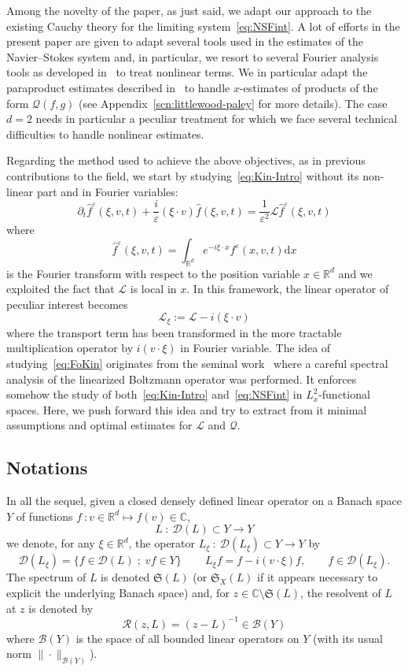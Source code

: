 \documentclass[AHL,Unicode,longabstracts,published]{cedram}
\renewcommand{\d}{\mathrm{d}}
\newcommand{\R}{\mathbb{R}}
\newcommand{\C}{\mathbb{C}}
\newcommand{\fkS}{\mathfrak{S}}
\newcommand{\LL}{\mathcal{L}}
\newcommand{\QQ}{\mathcal{Q}}
\newcommand{\RR}{\mathcal{R}}
\newcommand{\dom}{\mathscr{D}}
\newcommand{\BBB}{\mathscr{B}}
\newcommand*\eps{{\varepsilon}}
\begin{document}
Among the novelty of the paper, as just said, we adapt our approach to the existing Cauchy theory for the limiting system~\eqref{eq:NSFint}. A lot of efforts in the present paper are given to adapt several tools used in the estimates of the Navier--Stokes system and, in particular, we resort to several Fourier analysis tools as developed in~\cite{BCD2011} to treat nonlinear terms. We in particular adapt the paraproduct estimates described in~\cite{BCD2011} to handle $x$-estimates of products of the form $\QQ(f,g)$ (see Appendix~\ref{scn:littlewood-paley} for more details). The case $d=2$ needs in particular a peculiar treatment for which we face several technical difficulties to handle nonlinear estimates.



Regarding the method used to achieve the above objectives, as in previous contributions to the field, we start by studying~\eqref{eq:Kin-Intro} without its non-linear part and in Fourier variables:
\begin{equation}\label{eq:FoKin}
\partial_{t}\widehat{f}^{\eps}(\xi,v,t)+\frac{i}{\eps}(\xi \cdot v)\widehat{f}(\xi,v,t)=\frac{1}{\eps^{2}}\LL \widehat{f}^{\eps}(\xi,v,t)
\end{equation}
where
\[
\widehat{f}^{\eps}(\xi,v,t)=\int_{\R^{d}}e^{-i \xi \cdot x}f^{\eps}(x,v,t)\d x
\]
is the Fourier transform with respect to the position variable $x\in \R^{d}$ and we exploited the fact that $\LL$ is local in $x.$ In this framework, the linear operator of peculiar interest becomes
\[
\LL_{\xi}:=\LL-i(\xi\cdot v)
\]
where the transport term has been transformed in the more tractable multiplication operator by $i(v\cdot \xi)$ in Fourier variable. The idea of studying~\eqref{eq:FoKin} originates from the seminal work~\cite{EP1975} where a careful spectral analysis of the linearized Boltzmann operator was performed. It enforces somehow the study of both~\eqref{eq:Kin-Intro} and~\eqref{eq:NSFint} in $L^{2}_{x}$-functional spaces. Here, we push forward this idea and try to extract from it minimal assumptions and optimal estimates for $\LL$ and $\QQ$.

\subsection{Notations}

In all the sequel, given a closed densely defined linear operator on a Banach space $Y$ of functions $f\::v \in \R^{d} \mapsto f(v)\in \C$,
\[
L\::\:\dom(L) \subset Y \to Y
\]
we denote, for any $\xi \in \R^{d}$, the operator $L_{\xi}\::\:\dom(L_{\xi}) \subset Y \to Y$ by
\[
\dom(L_{\xi})=\{f \in \dom(L)\;;\; v f \in Y\}\, \qquad L_{\xi}f=f-i(v\cdot \xi)f, \qquad f \in \dom(L_{\xi}).
\]
The spectrum of $L$ is denoted $\fkS(L)$ (or $\fkS_X(L)$ if it appears necessary to explicit the underlying Banach space) and, for $z \in \C \setminus \fkS(L)$, the resolvent of $L$ at $z$ is denoted by
\[
\RR(z,L)=(z-L)^{-1} \in \BBB(Y)
\]
where $\BBB(Y)$ is the space of all bounded linear operators on $Y$ (with its usual norm $\|\cdot\|_{\BBB(Y)}$).
\end{document}
